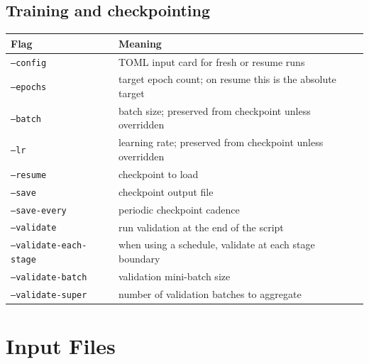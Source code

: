 \documentclass[11pt]{article}
\begin{document}
\subsection*{Training and checkpointing}
\begin{longtable}{@{}ll@{}}
\toprule
Flag & Meaning \\
\midrule
\texttt{--config} & TOML input card for fresh or resume runs \\
\texttt{--epochs} & target epoch count; on resume this is the absolute target \\
\texttt{--batch} & batch size; preserved from checkpoint unless overridden \\
\texttt{--lr} & learning rate; preserved from checkpoint unless overridden \\
\texttt{--resume} & checkpoint to load \\
\texttt{--save} & checkpoint output file \\
\texttt{--save-every} & periodic checkpoint cadence \\
\texttt{--validate} & run validation at the end of the script \\
\texttt{--validate-each-stage} & when using a schedule, validate at each stage boundary \\
\texttt{--validate-batch} & validation mini-batch size \\
\texttt{--validate-super} & number of validation batches to aggregate \\
\bottomrule
\end{longtable}

\section{Input Files}
\end{document}
